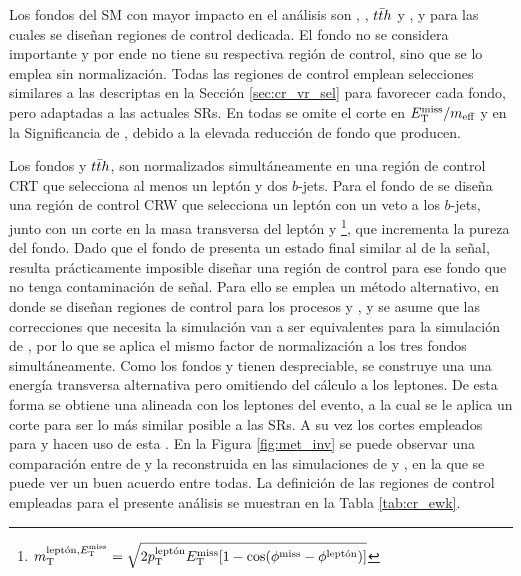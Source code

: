 
Los fondos del SM con mayor impacto en el análisis son \wph, \ttbarph, $t\bar{t} h$ y \znunuph, y para las cuales se diseñan regiones de control dedicada. El fondo \phj no se considera importante y por ende no tiene su respectiva región de control, sino que se lo emplea sin normalización. Todas las regiones de control emplean selecciones similares a las descriptas en la Sección \ref{sec:cr_vr_sel} para favorecer cada fondo, pero adaptadas a las actuales SRs. En todas se omite el corte en $E_{\text{T}}^{\text{miss}}/m_{\text{eff}}$ y en la Significancia de \met, debido a la elevada reducción de fondo que producen.


Los fondos \ttbarph y $t\bar{t} h$, son normalizados simultáneamente en una región de control CRT que selecciona al menos un leptón y dos $b$-jets. Para el fondo de \wph se diseña una región de control CRW que selecciona un leptón con un veto a los $b$-jets, junto con un corte en la masa transversa del leptón y \met \footnote{$m_{\text{T}}^{\text{leptón}, E_{\text{T}}^{\text{miss}}} = \sqrt{2p_{\text{T}}^{\text{leptón}}E_{\text{T}}^{\text{miss}}[1-\cos(\phi^{\text{miss}}-\phi^{\text{leptón}})]}$}, que incrementa la pureza del fondo. Dado que el fondo de \znunuph presenta un estado final similar al de la señal, resulta prácticamente imposible diseñar una región de control para ese fondo que no tenga contaminación de señal. Para ello se emplea un método alternativo, en donde se diseñan regiones de control para los procesos \zeeph y \zmumuph, y se asume que las correcciones que necesita la simulación van a ser equivalentes para la simulación de \znunuph, por lo que se aplica el mismo factor de normalización a los tres fondos simultáneamente. Como los fondos \zeeph y \zmumuph tienen \met despreciable, se construye una una energía transversa alternativa pero omitiendo del cálculo a los leptones. De esta forma se obtiene una \met alineada con los leptones del evento, a la cual se le aplica un corte para ser lo más similar posible a las SRs. A su vez los cortes empleados para \dphijetmet y \dphigammet hacen uso de esta \met. En la Figura \ref{fig:met_inv} se puede observar una comparación entre \met de \znunuph y la reconstruida en las simulaciones de \zeeph y \zmumuph, en la que se puede ver un buen acuerdo entre todas. La definición de las regiones de control empleadas para el presente análisis se muestran en la Tabla \ref{tab:cr_ewk}.

